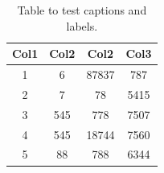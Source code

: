     \begin{table}[h!]
    \centering
    \caption{Table to test captions and labels.}
    \label{table:1}
    \begin{tabular}{c c c c} 
     \hline
     Col1 & Col2 & Col2 & Col3 \\ [0.5ex] 
     \hline
     1 & 6 & 87837 & 787 \\ 
     2 & 7 & 78 & 5415 \\
     3 & 545 & 778 & 7507 \\
     4 & 545 & 18744 & 7560 \\
     5 & 88 & 788 & 6344 \\ [1ex] 
     \hline
    \end{tabular}
    \end{table}